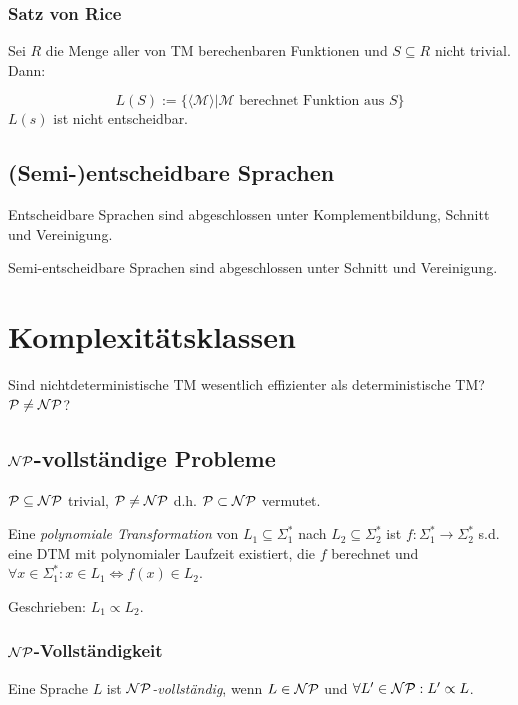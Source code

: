 \subsubsection*{Satz von Rice}

Sei $R$ die Menge aller von TM berechenbaren Funktionen und $S \subseteq R$ nicht trivial. Dann:

\vspace*{-4mm}
\[ L(S) := \{ \langle\mathcal{M}\rangle | \mathcal{M} \text{ berechnet Funktion aus } S \} \]
$L(s)$ ist nicht entscheidbar.

\subsection*{(Semi-)entscheidbare Sprachen}

Entscheidbare Sprachen sind abgeschlossen unter Komplementbildung, Schnitt und Vereinigung.

\spacing

Semi-entscheidbare Sprachen sind abgeschlossen unter Schnitt und Vereinigung.

\section*{Komplexitätsklassen}

Sind nichtdeterministische TM wesentlich effizienter als deterministische TM? $\mathcal{P} \neq \mathcal{NP}$?

\subsection*{$\mathcal{NP}$-vollständige Probleme}

$\mathcal{P} \subseteq \mathcal{NP}$ trivial, $\mathcal{P} \neq \mathcal{NP}$ d.h. $\mathcal{P} \subset \mathcal{NP}$ vermutet.

\spacing

Eine \emph{polynomiale Transformation} von $L_1 \subseteq \Sigma_1^*$ nach $L_2 \subseteq \Sigma_2^*$ ist $f : \Sigma_1^* \to \Sigma_2^*$ s.d. eine DTM mit polynomialer Laufzeit existiert, die $f$ berechnet und $\forall x \in \Sigma_1^* : x \in L_1 \iff f(x) \in L_2$.

Geschrieben: $L_1 \propto L_2$.

\subsubsection*{$\mathcal{NP}$-Vollständigkeit}

Eine Sprache $L$ ist \emph{$\mathcal{NP}$-vollständig}, wenn $L \in \mathcal{NP}$ und $\forall L' \in  \mathcal{NP} : L' \propto L$.


